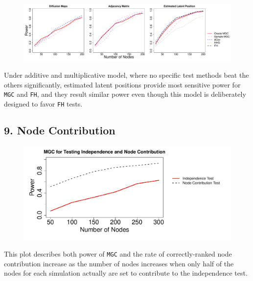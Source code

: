 \documentclass[12pt]{article}
\begin{document}
\begin{figure}[H]
	\centering
	\includegraphics[width=6in]{../Figure/ame.pdf}
	\label{fig:ame}
\end{figure}	

Under additive and multiplicative model, where no specific test methods beat the others significantly, estimated latent positions provide most sensitive power for \texttt{MGC} and \texttt{FH}, and they result similar power even though this model is deliberately designed to favor \texttt{FH} tests.

\subsection*{9. Node Contribution}

\begin{figure}[H]
	\centering
	\includegraphics[width=6in]{../Figure/nodecontri.pdf}
	\label{fig:contribution}
\end{figure}

This plot describes both power of \texttt{MGC} and the rate of correctly-ranked node contribution increase as the number of nodes increases when only half of the nodes for each simulation actually are set to contribute to the independence test. 
\end{document}
